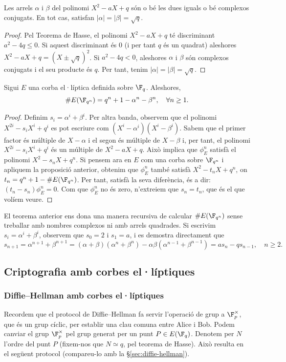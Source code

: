 \begin{lemma}
Les arrels $\alpha$ i $\beta$ del polinomi $X^2-aX+q$ són o bé les dues iguals o bé complexos conjugats. En tot cas, satisfan $|\alpha|=|\beta|=\sqrt{q}$.
\end{lemma}
\begin{proof}
 Pel Teorema de Hasse, el polinomi $X^2-aX+q$ té discriminant $a^2-4q\leq 0$. Si aquest discriminant és $0$ (i per tant $q$ és un quadrat) aleshores $X^2-aX+q = (X\pm\sqrt{q})^2$. Si $a^2-4q<0$, aleshores $\alpha$ i $\beta$ són complexos conjugats i el seu producte és $q$. Per tant, tenim $|\alpha|=|\beta|=\sqrt{q}$.
\end{proof}
\begin{theorem}
 Sigui $E$ una corba el·líptica definida sobre $\F_q$. Aleshores,
 \[
 \# E(\F_{q^n}) = q^n + 1 - \alpha^n - \beta^n,\quad \forall n\geq 1.
 \]
\end{theorem}
\begin{proof}
Definim $s_i=\alpha^i+\beta^i$. Per altra banda, observem que el polinomi $X^{2i}-s_iX^i+q^i$ es pot escriure com $(X^i-\alpha^i)(X^i-\beta^i)$. Sabem que el primer factor és múltiple de $X-\alpha$ i el segon és múltiple de $X-\beta$ i, per tant, el polinomi $X^{2i}-s_iX^i+q^i$ és un múltiple de $X^2-aX+q$. Això implica que $\phi_E^n$ satisfà el polinomi $X^2-s_nX+q^n$. Si pensem ara en $E$ com una corba sobre $\F_{q^n}$ i apliquem la proposició anterior, obtenim que $\phi_E^n$ també satisfà $X^2-t_nX+q^n$, on $t_n=q^n+1-\#E(\F_{q^n})$. Per tant, satisfà la seva diferència, és a dir: $(t_n-s_n)\phi_E^n = 0$. Com que $\phi_E^n$ no és zero, n'extreiem que $s_n=t_n$, que és el que volíem veure.
\end{proof}
\begin{remark}
El teorema anterior ens dona una manera recursiva de calcular $\#E(\F_{q^n})$ sense treballar amb nombres complexos ni amb arrels quadrades. Si escrivim $s_i=\alpha^i+\beta^i$, observem que $s_0=2$ i $s_1=a$, i es demostra directament que
\[
s_{n+1}=\alpha^{n+1}+\beta^{n+1} = (\alpha+\beta)(\alpha^n+\beta^n) - \alpha\beta(\alpha^{n-1}+\beta^{n-1}) =
as_n-qs_{n-1}, \quad n\geq 2.
\]
\end{remark}

 \subsection{Criptografia amb corbes el·líptiques}
 
 \subsubsection{Diffie--Hellman amb corbes el·líptiques}
 Recordem que el protocol de Diffie--Hellman fa servir l'operació de grup a $\F_p^\times$, que és un grup cíclic, per establir una clau comuna entre Alice i Bob. Podem canviar el grup $\F_p^\times$ pel grup generat per un punt $P\in E(\F_q)$. Denotem per $N$ l'ordre del punt $P$ (fixem-nos que $N\simeq q$, pel teorema de Hasse). Això resulta en el següent protocol (compareu-lo amb la \S\ref{sec:diffie-hellman}).
 
